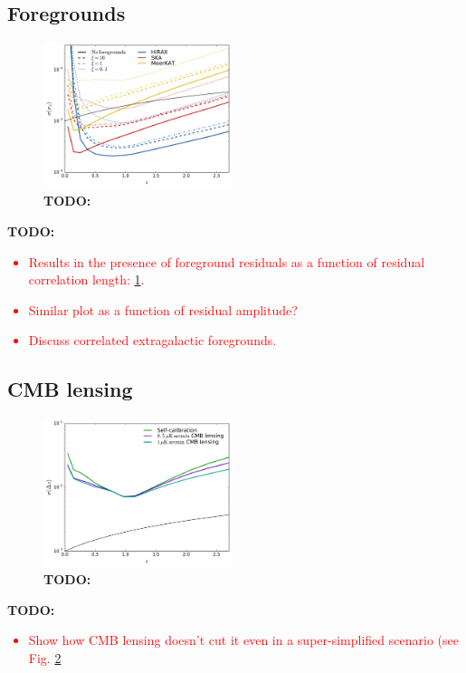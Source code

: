 \documentclass[prd,twocolumn]{revtex4}
\newcommand{\TODO}[1]{{\bf TODO:} \textcolor{red}{#1}}
\begin{document}
  \subsection{Foregrounds} \label{ssec:results.foregrounds}
    \begin{figure}
      \centering
      \includegraphics[width=0.49\textwidth]{compare_FG}
      \caption{\TODO{}}
      \label{fig:fg_xi}
    \end{figure}
    \TODO{
      \begin{itemize}
        \item Results in the presence of foreground residuals as a function of residual correlation length: \ref{fig:fg_xi}.
        \item Similar plot as a function of residual amplitude?
        \item Discuss correlated extragalactic foregrounds.
      \end{itemize}
    }

  \subsection{CMB lensing} \label{ssec:results.cmblens}
    \begin{figure}
      \centering
      \includegraphics[width=0.49\textwidth]{compare_CMBlens}
      \caption{\TODO{}}
      \label{fig:compare_cmblens}
    \end{figure}
    \TODO{
      \begin{itemize}
        \item Show how CMB lensing doesn't cut it even in a super-simplified scenario (see Fig. \ref{fig:compare_cmblens}
      \end{itemize}
    }
\end{document}
